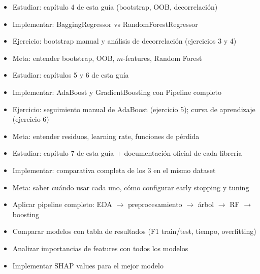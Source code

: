 \documentclass[11pt, a4paper]{book}
\begin{document}
\begin{tcolorbox}[colback=infobg, colframe=baggingblue, title={\faCalendar\ Semana 2 — Bagging y Random Forest}]
  \begin{itemize}[noitemsep]
    \item Estudiar: capítulo 4 de esta guía (bootstrap, OOB, decorrelación)
    \item Implementar: BaggingRegressor vs RandomForestRegressor
    \item Ejercicio: bootstrap manual y análisis de decorrelación (ejercicios 3 y 4)
    \item Meta: entender bootstrap, OOB, $m$-features, Random Forest
  \end{itemize}
\end{tcolorbox}

\begin{tcolorbox}[colback=warningbg, colframe=boostingorange, title={\faCalendar\ Semana 3 — Boosting: AdaBoost y Gradient Boosting}]
  \begin{itemize}[noitemsep]
    \item Estudiar: capítulos 5 y 6 de esta guía
    \item Implementar: AdaBoost y GradientBoosting con Pipeline completo
    \item Ejercicio: seguimiento manual de AdaBoost (ejercicio 5); curva de aprendizaje (ejercicio 6)
    \item Meta: entender residuos, learning rate, funciones de pérdida
  \end{itemize}
\end{tcolorbox}

\begin{tcolorbox}[colback=critbg, colframe=accent, title={\faCalendar\ Semana 4 — XGBoost, LightGBM y CatBoost}]
  \begin{itemize}[noitemsep]
    \item Estudiar: capítulo 7 de esta guía + documentación oficial de cada librería
    \item Implementar: comparativa completa de los 3 en el mismo dataset
    \item Meta: saber cuándo usar cada uno, cómo configurar early stopping y tuning
  \end{itemize}
\end{tcolorbox}

\begin{tcolorbox}[colback=successbg, colframe=treegreen, title={\faTrophy\ Consolidación — Proyecto Integrador}]
  \begin{itemize}[noitemsep]
    \item Aplicar pipeline completo: EDA $\to$ preprocesamiento $\to$ árbol $\to$ RF $\to$ boosting
    \item Comparar modelos con tabla de resultados (F1 train/test, tiempo, overfitting)
    \item Analizar importancias de features con todos los modelos
    \item Implementar SHAP values para el mejor modelo
  \end{itemize}
\end{tcolorbox}
\end{document}
